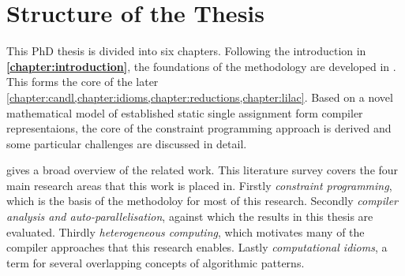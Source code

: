 



\newpage
\section{Structure of the Thesis}

    This PhD thesis is divided into six chapters.
    Following the introduction in {\bf\cref{chapter:introduction}},
    the foundations of the methodology are developed in
    {\bf{}}.
    This forms the core of the later
    \cref{chapter:candl,chapter:idioms,chapter:reductions,chapter:lilac}.
    Based on a novel mathematical model of established static single assignment
    form compiler representaions, the core of the constraint programming
    approach is derived and some particular challenges are discussed in detail.

    {\bf{}} gives a broad overview of the related work.
    This literature survey covers the four main research areas that this work
    is placed in.
    Firstly {\em constraint programming}, which is the basis of the methodoloy
    for most of this research.
    Secondly {\em compiler analysis and auto-parallelisation}, against which the
    results in this thesis are evaluated.
    Thirdly {\em heterogeneous computing}, which motivates many of the compiler
    approaches that this research enables.
    Lastly {\em computational idioms}, a term for several overlapping concepts
    of algorithmic patterns.

